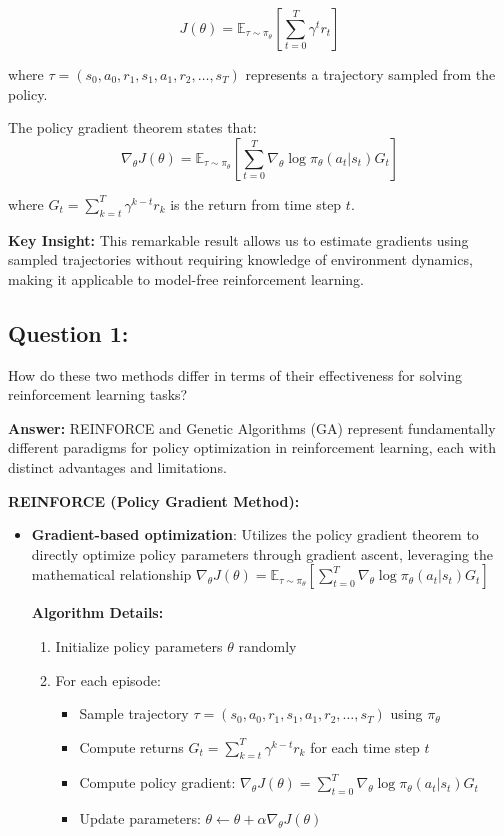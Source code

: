 \documentclass[12pt]{article}
\begin{document}
{{{$$J(\theta) = \mathbb{E}_{\tau \sim \pi_\theta}\left[\sum_{t=0}^{T} \gamma^t r_t\right]$$

where $\tau = (s_0, a_0, r_1, s_1, a_1, r_2, \ldots, s_T)$ represents a trajectory sampled from the policy.

The policy gradient theorem states that:
$$\nabla_\theta J(\theta) = \mathbb{E}_{\tau \sim \pi_\theta}\left[\sum_{t=0}^{T} \nabla_\theta \log \pi_\theta(a_t|s_t) G_t\right]$$

where $G_t = \sum_{k=t}^{T} \gamma^{k-t} r_k$ is the return from time step $t$.

\textbf{Key Insight:} This remarkable result allows us to estimate gradients using sampled trajectories without requiring knowledge of environment dynamics, making it applicable to model-free reinforcement learning.

\subsection{Question 1:}
How do these two methods differ in terms of their effectiveness for solving reinforcement learning tasks? 

\textbf{Answer:} REINFORCE and Genetic Algorithms (GA) represent fundamentally different paradigms for policy optimization in reinforcement learning, each with distinct advantages and limitations.

\textbf{REINFORCE (Policy Gradient Method):}
\begin{itemize}
    \item \textbf{Gradient-based optimization}: Utilizes the policy gradient theorem to directly optimize policy parameters through gradient ascent, leveraging the mathematical relationship $\nabla_\theta J(\theta) = \mathbb{E}_{\tau \sim \pi_\theta}[\sum_{t=0}^{T} \nabla_\theta \log \pi_\theta(a_t|s_t) G_t]$
    
    \textbf{Algorithm Details:}
    \begin{enumerate}
        \item Initialize policy parameters $\theta$ randomly
        \item For each episode:
        \begin{itemize}
            \item Sample trajectory $\tau = (s_0, a_0, r_1, s_1, a_1, r_2, \ldots, s_T)$ using $\pi_\theta$
            \item Compute returns $G_t = \sum_{k=t}^{T} \gamma^{k-t} r_k$ for each time step $t$
            \item Compute policy gradient: $\nabla_\theta J(\theta) = \sum_{t=0}^{T} \nabla_\theta \log \pi_\theta(a_t|s_t) G_t$
            \item Update parameters: $\theta \leftarrow \theta + \alpha \nabla_\theta J(\theta)$
        \end{itemize}
    \end{enumerate}
    

\end{itemize}}}}
\end{document}
